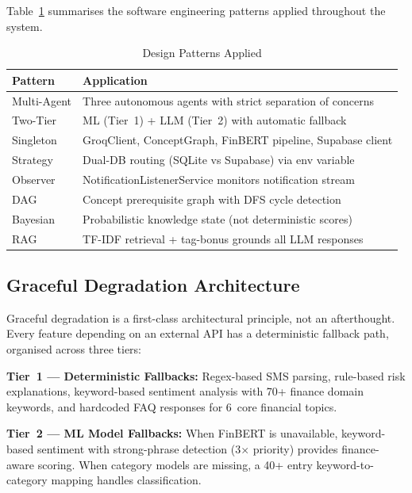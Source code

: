 \documentclass[conference]{IEEEtran}
\begin{document}
Table~\ref{tab:patterns} summarises the software engineering patterns applied throughout the system.

\begin{table}[!t]
\centering
\caption{Design Patterns Applied}
\label{tab:patterns}
\renewcommand{\arraystretch}{1.15}
\footnotesize
\begin{tabular}{p{2cm} p{5.2cm}}
\toprule
\textbf{Pattern} & \textbf{Application} \\
\midrule
Multi-Agent   & Three autonomous agents with strict separation of concerns \\
Two-Tier      & ML (Tier~1) + LLM (Tier~2) with automatic fallback \\
Singleton     & GroqClient, ConceptGraph, FinBERT pipeline, Supabase client \\
Strategy      & Dual-DB routing (SQLite vs Supabase) via env variable \\
Observer      & NotificationListenerService monitors notification stream \\
DAG           & Concept prerequisite graph with DFS cycle detection \\
Bayesian      & Probabilistic knowledge state (not deterministic scores) \\
RAG           & TF-IDF retrieval + tag-bonus grounds all LLM responses \\
\bottomrule
\end{tabular}
\end{table}

\subsection{Graceful Degradation Architecture}

Graceful degradation is a first-class architectural principle, not an afterthought. Every feature depending on an external API has a deterministic fallback path, organised across three tiers:

\textbf{Tier~1 --- Deterministic Fallbacks:} Regex-based SMS parsing, rule-based risk explanations, keyword-based sentiment analysis with 70+ finance domain keywords, and hardcoded FAQ responses for 6~core financial topics.

\textbf{Tier~2 --- ML Model Fallbacks:} When FinBERT is unavailable, keyword-based sentiment with strong-phrase detection (3$\times$ priority) provides finance-aware scoring. When category models are missing, a 40+ entry keyword-to-category mapping handles classification.
\end{document}
